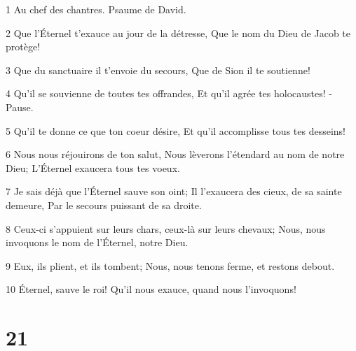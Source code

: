 \par 1 Au chef des chantres. Psaume de David.
\par 2 Que l'Éternel t'exauce au jour de la détresse, Que le nom du Dieu de Jacob te protège!
\par 3 Que du sanctuaire il t'envoie du secours, Que de Sion il te soutienne!
\par 4 Qu'il se souvienne de toutes tes offrandes, Et qu'il agrée tes holocaustes! -Pause.
\par 5 Qu'il te donne ce que ton coeur désire, Et qu'il accomplisse tous tes desseins!
\par 6 Nous nous réjouirons de ton salut, Nous lèverons l'étendard au nom de notre Dieu; L'Éternel exaucera tous tes voeux.
\par 7 Je sais déjà que l'Éternel sauve son oint; Il l'exaucera des cieux, de sa sainte demeure, Par le secours puissant de sa droite.
\par 8 Ceux-ci s'appuient sur leurs chars, ceux-là sur leurs chevaux; Nous, nous invoquons le nom de l'Éternel, notre Dieu.
\par 9 Eux, ils plient, et ils tombent; Nous, nous tenons ferme, et restons debout.
\par 10 Éternel, sauve le roi! Qu'il nous exauce, quand nous l'invoquons!

\chapter{21}

